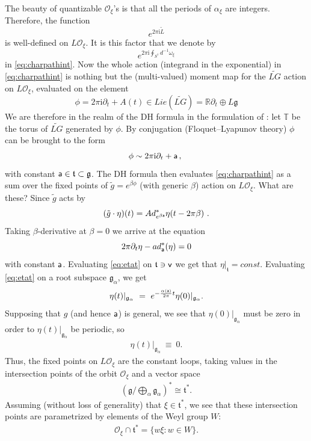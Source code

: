 \documentclass[12pt]{article}
\numberwithin{equation}{section}
\newcommand\beq{\begin{equation}}
\newcommand\eeq{\end{equation}}
\theoremstyle{definition}
\newcommand {\BR}   {\mathbb R}
\newcommand {\BT}   {\mathbb T}
\newcommand {\CalO} {\mathcal O}
\newcommand {\fg} {\mathfrak{g}}
\newcommand {\ii} {\mathrm{i}}
\begin{document}
The beauty of quantizable $\CalO_{\xi}$'s is that all the periods of 
${\alpha}_{\xi}$ are integers. Therefore, the function 
\beq
e^{2\pi\ii {\tilde L}}
\eeq
is well-defined on $L{\CalO}_{\xi}$. It is this factor that we denote by
\beq
e^{2\pi\ii \oint_{S^{1}} d^{-1}{\omega}_{\xi}}
\eeq
in \eqref{eq:charpathint}. Now the whole action (integrand in the exponential) in \eqref{eq:charpathint} is nothing but the (multi-valued) moment map for the ${\widetilde{LG}}$ action on $L{\CalO}_{\xi}$, evaluated on the element
\beq
{\phi} = {2\pi\ii} {\partial}_{t} + A(t) \in Lie ({\widetilde{LG}} ) = {\BR} {\partial}_{t} \oplus L {\fg}
\eeq
We are therefore in the realm of the DH formula in the formulation of \cite{DH2}: let ${\BT}$ be the torus of ${\widetilde{LG}}$
generated by $\phi$. By conjugation (Floquet--Lyapunov theory) ${\phi}$ can be brought to the form 
\beq
{\phi} \sim {2\pi\ii}{\partial}_{t} + {\sf a}\, , \ 
\eeq
with constant ${\sf a} \in {\mathfrak{t}} \subset {\fg}$. The DH formula then evaluates \eqref{eq:charpathint} as a sum over the fixed points of ${\tilde g} = e^{{\beta}{\phi}}$ (with generic $\beta$) action on ${L{\CalO}_{\xi}}$. What are these? Since ${\tilde g}$ acts by 
\beq
({\tilde g}\cdot {\eta} ) (t) = Ad_{e^{\beta{\sf a}}}^{*}  {\eta} ( t - 2\pi \beta ) \ .
\eeq
Taking $\beta$-derivative at $\beta =0$ we arrive at the equation
\beq
2{\pi}{\partial}_{t}{\eta} - ad^{*}_{\sf a}({\eta}) = 0
\label{eq:etat}
\eeq
with constant ${\sf a}$. Evaluating \eqref{eq:etat} on ${\mathfrak{t}} \ni {\sf v}$ we get 
that ${\eta}\vert_{{\mathfrak{t}}} = const$. Evaluating \eqref{eq:etat} on a root subspace ${\fg}_{\alpha}$, we get
\beq
{\eta} (t) \vert_{{\fg}_{\alpha}}\ = \ e^{-\frac{{\alpha}({\sf a})}{2\pi} t} {\eta} (0) \vert_{{\fg}_{\alpha}}.
\eeq
Supposing that $g$ (and hence ${\sf a}$) is general, we see that ${\eta} (0) \vert_{{\fg}_{\alpha}}$ must be zero in order to ${\eta} (t) \vert_{{\fg}_{\alpha}}$ be periodic, so
\begin{align*}
{\eta} (t) \vert_{{\fg}_{\alpha}} \ \equiv \ 0.
\end{align*}
Thus, the fixed points on $L{\CalO}_{\xi}$ are the constant loops, taking values in the intersection points of the orbit ${\CalO}_{\xi}$ and a vector space
\begin{align*}
    ({\fg} / \bigoplus\limits_{\alpha} {\fg}_{\alpha})^{*} \cong {\mathfrak{t}}^{*}.
\end{align*}
Assuming (without loss of generality) that $\xi \in {\mathfrak{t}}^{*}$, we see that these intersection points are parametrized by elements of the Weyl group $W$:
\begin{align*}
    {\CalO}_{\xi} \cap {\mathfrak{t}}^{*} = \{w\xi: w \in W\}.
\end{align*}
\end{document}
